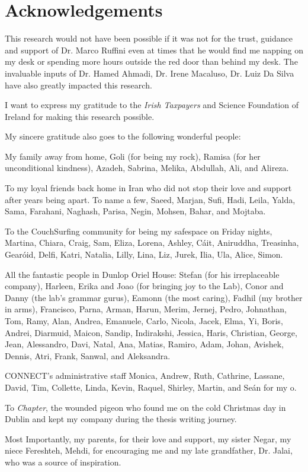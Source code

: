 \chapter*{Acknowledgements}
\begin{spacing}{1.3}
This research would not have been possible if it was not for the trust, guidance and support of Dr. Marco Ruffini even at times that he would find me napping on my desk or spending more hours outside the red door than behind my desk. The invaluable inputs of Dr. Hamed Ahmadi, Dr. Irene Macaluso, Dr. Luiz Da Silva have also greatly impacted this research.


I want to express my gratitude to the \textit{Irish Taxpayers} and Science Foundation of Ireland for making this research possible.


My sincere gratitude also goes to the following wonderful people:

My family away from home, Goli (for being my rock), Ramisa (for her unconditional kindness), Azadeh, Sabrina, Melika, Abdullah, Ali, and Alireza.


To my loyal friends back home in Iran who did not stop their love and support after years being apart. To name a few, Saeed, Marjan, Sufi, Hadi, Leila, Yalda, Sama, Farahani, Naghash, Parisa, Negin, Mohsen, Bahar, and Mojtaba.

To the CouchSurfing community for being my safespace on Friday nights, Martina, Chiara, Craig, Sam, Eliza, Lorena, Ashley, Cáit, Aniruddha, Treasinha, Gearóid, Delfi, Katri, Natalia, Lilly, Lina, Liz, Jurek, Ilia, Ula, Alice, Simon.

All the fantastic people in Dunlop Oriel House: Stefan (for his irreplaceable company), Harleen, Erika and Joao (for bringing joy to the Lab), Conor and Danny (the lab's grammar gurus), Eamonn (the most caring), Fadhil (my brother in arms), Francisco, Parna, Arman, Harun, Merim, Jernej, Pedro, Johnathan, Tom, Ramy, Alan, Andrea, Emanuele, Carlo, Nicola, Jacek, Elma, Yi, Boris, Andrei, Diarmuid, Maicon, Sandip, Indirakshi, Jessica, Haris, Christian, George, Jean, Alessandro, Davi, Natal, Ana, Matias, Ramiro, Adam, Johan, Avishek, Dennis, Atri, Frank, Sanwal, and Aleksandra.

CONNECT's administrative staff Monica, Andrew, Ruth, Cathrine, Lassane, David, Tim, Collette, Linda, Kevin, Raquel, Shirley, Martin, and Seán for my o.

To \textit{Chapter}, the wounded pigeon who found me on the cold Christmas day in Dublin and kept my company during the thesis writing journey.

Most Importantly, my parents, for their love and support, my sister Negar, my niece Fereshteh, Mehdi, for encouraging me and my late grandfather, Dr. Jalai, who was a source of inspiration.

\end{spacing}
